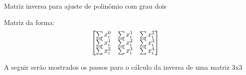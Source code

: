\documentclass[10pt]{beamer}
\begin{document}
\begin{frame}[fragile]{Matriz inversa para ajuste de polinômio com grau dois}
  
  Matriz da forma: 
  \[
  \begin{bmatrix}
    \sum{x_{i}^{0}} & \sum{x_{i}^{1}} & \sum{x_{i}^{2}} \\
    \sum{x_{i}^{1}} & \sum{x_{i}^{2}} & \sum{x_{i}^{3}} \\
    \sum{x_{i}^{2}} & \sum{x_{i}^{3}} & \sum{x_{i}^{4}}
  \end{bmatrix}
  \newline
  \newline
  \newline
  \newline\]



  

  A seguir serão mostrados os passos para o cálculo da inversa de uma matriz 3x3

\end{frame}
\end{document}
